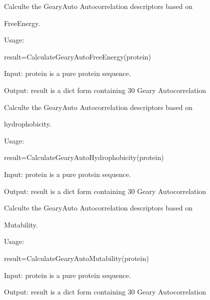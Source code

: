 \documentclass[letterpaper,10pt,english]{sphinxmanual}
\begin{document}

\begin{fulllineitems}
\label{reference/Autocorrelation:Autocorrelation.CalculateGearyAutoFreeEnergy}
Calculte the GearyAuto Autocorrelation descriptors based on

FreeEnergy.

Usage:

result=CalculateGearyAutoFreeEnergy(protein)

Input: protein is a pure protein sequence.

Output: result is a dict form containing 30 Geary Autocorrelation

\end{fulllineitems}


\begin{fulllineitems}
\label{reference/Autocorrelation:Autocorrelation.CalculateGearyAutoHydrophobicity}
Calculte the GearyAuto Autocorrelation descriptors based on

hydrophobicity.

Usage:

result=CalculateGearyAutoHydrophobicity(protein)

Input: protein is a pure protein sequence.

Output: result is a dict form containing 30 Geary Autocorrelation

\end{fulllineitems}


\begin{fulllineitems}
\label{reference/Autocorrelation:Autocorrelation.CalculateGearyAutoMutability}
Calculte the GearyAuto Autocorrelation descriptors based on

Mutability.

Usage:

result=CalculateGearyAutoMutability(protein)

Input: protein is a pure protein sequence.

Output: result is a dict form containing 30 Geary Autocorrelation

\end{fulllineitems}
\end{document}
